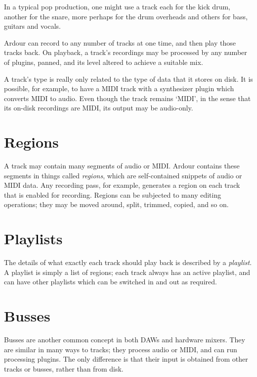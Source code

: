 \documentclass[10pt,a4paper]{book}
\begin{document}
In a typical pop production, one might use a track each for the kick
drum, another for the snare, more perhaps for the drum overheads and
others for bass, guitars and vocals.

Ardour can record to any number of tracks at one time, and then play
those tracks back.  On playback, a track's recordings may be processed
by any number of plugins, panned, and its level altered to achieve a
suitable mix.

\begin{danger}
A track's type is really only related to the type of data that it
stores on disk.  It is possible, for example, to have a MIDI track
with a synthesizer plugin which converts MIDI to audio.  Even though
the track remains `MIDI', in the sense that its on-disk recordings are
MIDI, its output may be audio-only.
\end{danger}


\section{Regions}

A track may contain many segments of audio or MIDI\@.  Ardour contains
these segments in things called \emph{regions}, which are
self-contained snippets of audio or MIDI data.  Any recording pass,
for example, generates a region on each track that is enabled for
recording.  Regions can be subjected to many editing operations; they
may be moved around, split, trimmed, copied, and so on.


\section{Playlists}

The details of what exactly each track should play back is described
by a \emph{playlist}.  A playlist is simply a list of regions; each
track always has an active playlist, and can have other playlists
which can be switched in and out as required.


\section{Busses}

Busses are another common concept in both DAWs and hardware mixers.
They are similar in many ways to tracks; they process audio or MIDI,
and can run processing plugins.  The only difference is that their
input is obtained from other tracks or busses, rather than from disk.
\end{document}
